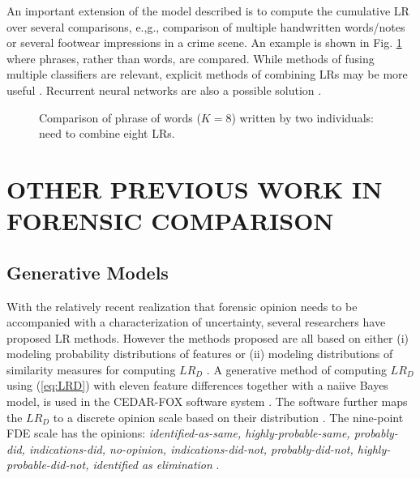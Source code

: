 \documentclass[11pt, doublespacing]{article}
\begin{document}
An important extension of the model described is to compute the cumulative LR over several comparisons, e.,g., comparison of multiple handwritten words/notes or  several footwear impressions in a crime scene.  An example is shown in Fig. \ref{fig:US-examples} where  phrases, rather than words,  are compared.  While methods of fusing multiple classifiers \cite{Ho1994} are relevant, explicit methods of combining LRs may be more useful \cite{Kovalenko2012}. Recurrent neural networks are also a possible solution \cite{LeCun2015}.
\begin{figure}[htb]
\centering
{}\hfill
{}
\caption{\small Comparison of  phrase of words ($K=8$) written by two individuals: need to combine  eight LRs.} 
\label{fig:US-examples}
\end{figure}



\section{OTHER PREVIOUS WORK IN FORENSIC COMPARISON}
\label{PreviousWork}
\subsection{Generative Models}
With the relatively  recent realization that forensic opinion needs to be accompanied with a characterization of uncertainty, several researchers have proposed LR methods. However the methods proposed are all based on  either (i) modeling probability distributions of features or (ii) modeling distributions of similarity measures for computing  $LR_D$ \cite{Neumann2007,Taylor12}.
A generative method of computing $LR_D$  using  (\ref{eq:LRD})  with  eleven feature differences together with a naiive Bayes model, is used in the CEDAR-FOX software system \cite{Srihari2007}. The  software further maps the  $LR_D$  to a discrete  opinion scale based on their distribution \cite{Srihari2008a}. The nine-point FDE scale has the opinions: {\em identified-as-same, highly-probable-same, probably-did, indications-did, no-opinion, indications-did-not, probably-did-not, highly-probable-did-not, identified as elimination} \cite{Srihari2014a}.
\end{document}

